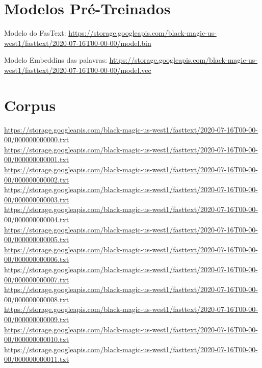 \begin{apendicesenv}
\section{Modelos Pré-Treinados}

Modelo do FasText: \url{https://storage.googleapis.com/black-magic-us-west1/fasttext/2020-07-16T00-00-00/model.bin}

Modelo Embeddins das palavras: \url{https://storage.googleapis.com/black-magic-us-west1/fasttext/2020-07-16T00-00-00/model.vec}

\section{Corpus}

\url{https://storage.googleapis.com/black-magic-us-west1/fasttext/2020-07-16T00-00-00/000000000000.txt} \\
\url{https://storage.googleapis.com/black-magic-us-west1/fasttext/2020-07-16T00-00-00/000000000001.txt} \\
\url{https://storage.googleapis.com/black-magic-us-west1/fasttext/2020-07-16T00-00-00/000000000002.txt} \\
\url{https://storage.googleapis.com/black-magic-us-west1/fasttext/2020-07-16T00-00-00/000000000003.txt} \\
\url{https://storage.googleapis.com/black-magic-us-west1/fasttext/2020-07-16T00-00-00/000000000004.txt} \\
\url{https://storage.googleapis.com/black-magic-us-west1/fasttext/2020-07-16T00-00-00/000000000005.txt} \\
\url{https://storage.googleapis.com/black-magic-us-west1/fasttext/2020-07-16T00-00-00/000000000006.txt} \\
\url{https://storage.googleapis.com/black-magic-us-west1/fasttext/2020-07-16T00-00-00/000000000007.txt} \\
\url{https://storage.googleapis.com/black-magic-us-west1/fasttext/2020-07-16T00-00-00/000000000008.txt} \\
\url{https://storage.googleapis.com/black-magic-us-west1/fasttext/2020-07-16T00-00-00/000000000009.txt} \\
\url{https://storage.googleapis.com/black-magic-us-west1/fasttext/2020-07-16T00-00-00/000000000010.txt} \\
\url{https://storage.googleapis.com/black-magic-us-west1/fasttext/2020-07-16T00-00-00/000000000011.txt} \\

\end{apendicesenv}
